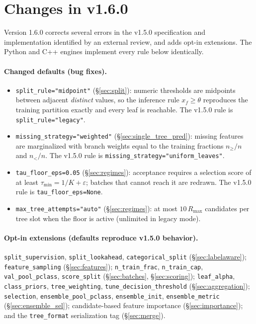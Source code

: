 \documentclass[11pt,a4paper]{article}
\newcommand{\code}[1]{\texttt{#1}}
\begin{document}
\section*{Changes in v1.6.0}

Version 1.6.0 corrects several errors in the v1.5.0 specification and implementation identified by an external review, and adds opt-in extensions. The Python and C++ engines implement every rule below identically.

\paragraph{Changed defaults (bug fixes).}
\begin{itemize}[leftmargin=*, itemsep=2pt]
  \item \code{split\_rule="midpoint"} (\S\ref{sec:split}): numeric thresholds are midpoints between adjacent \emph{distinct} values, so the inference rule $x_f \ge \theta$ reproduces the training partition exactly and every leaf is reachable. The v1.5.0 rule is \code{split\_rule="legacy"}.
  \item \code{missing\_strategy="weighted"} (\S\ref{sec:single_tree_pred}): missing features are marginalized with branch weights equal to the training fractions $n_{\ge}/n$ and $n_{<}/n$. The v1.5.0 rule is \code{missing\_strategy="uniform\_leaves"}.
  \item \code{tau\_floor\_eps=0.05} (\S\ref{sec:regimes}): acceptance requires a selection score of at least $\tau_{\min} = 1/K + \varepsilon$; batches that cannot reach it are redrawn. The v1.5.0 rule is \code{tau\_floor\_eps=None}.
  \item \code{max\_tree\_attempts="auto"} (\S\ref{sec:regimes}): at most $10\,R_{\max}$ candidates per tree slot when the floor is active (unlimited in legacy mode).
\end{itemize}

\paragraph{Opt-in extensions (defaults reproduce v1.5.0 behavior).}
\code{split\_supervision}, \code{split\_lookahead}, \code{categorical\_split} (\S\ref{sec:labelaware}); \code{feature\_sampling} (\S\ref{sec:features}); \code{n\_train\_frac}, \code{n\_train\_cap}, \code{val\_pool\_pclass}, \code{score\_split} (\S\ref{sec:batches}, \S\ref{sec:scoring}); \code{leaf\_alpha}, \code{class\_priors}, \code{tree\_weighting}, \code{tune\_decision\_threshold} (\S\ref{sec:aggregation}); \code{selection}, \code{ensemble\_pool\_pclass}, \code{ensemble\_init}, \code{ensemble\_metric} (\S\ref{sec:ensemble_sel}); candidate-based feature importance (\S\ref{sec:importance}); and the \code{tree\_format} serialization tag (\S\ref{sec:merge}).
\end{document}
